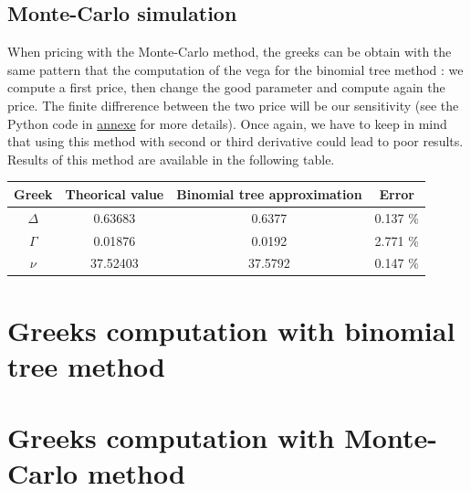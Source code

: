 \documentclass[hidelinks]{article}
\begin{document}
\newpage
\subsection{Monte-Carlo simulation}
When pricing with the Monte-Carlo method, the greeks can be obtain with the same pattern that the computation of the vega for the binomial tree method : we compute a first price, then change the good parameter and compute again the price. The finite diffrerence between the two price will be our sensitivity (see the Python code in \href{sec:mc}{annexe} for more details). Once again, we have to keep in mind that using this method with second or third derivative could lead to poor results. Results of this method are available in the following table.
\newline


\begin{tabular}{|c|c|c|c|}
\hline
Greek & Theorical value & Binomial tree approximation & Error \\
\hline
$\Delta$ & 0.63683 & 0.6377 & 0.137 \% \\
\hline
$\Gamma$ & 0.01876 & 0.0192 & 2.771 \%\\
\hline
$\nu$ & 37.52403 & 37.5792 & 0.147 \% \\
\hline
\end{tabular}
\newpage
\appendix
\section{Greeks computation with binomial tree method}
\label{sec:binom}
    
    \newpage
\section{Greeks computation with Monte-Carlo method}
\label{sec:mc}
    
\end{document}
